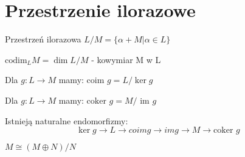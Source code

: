 \section{Przestrzenie ilorazowe}


\begin{definition}
    Przestrzeń ilorazowa $L/M = \{ \alpha + M | \alpha \in L \}$
\end{definition}
\begin{definition}
    $\text{codim}_L M = \dim L/M$ - kowymiar M w L
\end{definition}
\begin{definition}
    Dla $g : L \to M$ mamy: $\text{coim } g = L / \ker g$
\end{definition}
\begin{definition}
    Dla $g : L \to M$ mamy: $\text{coker } g = M / \text{ im } g$
\end{definition}
\begin{statement}
    Istnieją naturalne endomorfizmy:
    \begin{equation*}
        \ker g \to L \to {coim } g \to { im } g \to M \to \text{coker } g
    \end{equation*}
\end{statement}

\begin{note}
    $ M \cong (M \oplus N) / N$ 
\end{note}